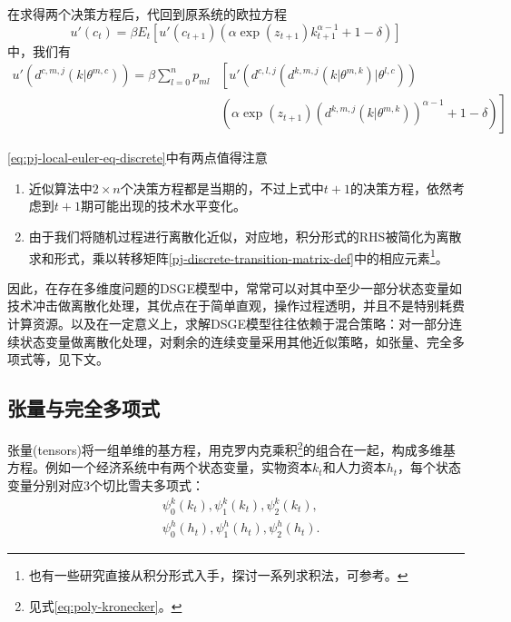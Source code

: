 在求得两个决策方程后，代回到原系统的欧拉方程
\begin{equation}
  \label{eq:pj-local-euler-eq}
  u'(c_t) = \beta E_t \left[ u'\left( c_{t+1} \right) \left( \alpha \exp(z_{t+1}) k_{t+1}^{\alpha - 1} + 1 - \delta \right) \right]
\end{equation}
中，我们有
\begin{equation}
  \label{eq:pj-local-euler-eq-discrete}
  \begin{split}
    u'\left( d^{c,m,j} \left( k | \theta^{m,c} \right)\right) = \beta \sum_{l=0}^{n} p_{ml} &\left[
    u'\left(
    d^{c,l,j}
    \left( d^{k,m,j} \left( k | \theta^{m,k} \right) | \theta^{l,c} \right)
     \right) \right. \\
     & \left. \left(
     \alpha \exp(z_{t+1})
     \left(
     d^{k,m,j} \left( k | \theta^{m,k} \right)
    \right)^{\alpha-1}
     + 1 - \delta
     \right)
    \right]
  \end{split}
\end{equation}

\eqref{eq:pj-local-euler-eq-discrete}中有两点值得注意
\begin{enumerate}
  \item 近似算法中$2 \times n$个决策方程都是当期的，不过上式中$t+1$的决策方程，依然考虑到$t+1$期可能出现的技术水平变化。
  \item  由于我们将随机过程进行离散化近似，对应地，积分形式的RHS被简化为离散求和形式，乘以转移矩阵\eqref{pj-discrete-transition-matrix-def}中的相应元素\footnote{也有一些研究直接从积分形式入手，探讨一系列求积法，可参考\cite{Judd:1998uy,Judd:2011iw}。}。
\end{enumerate}

因此，在存在多维度问题的DSGE模型中，常常可以对其中至少一部分状态变量如技术冲击做离散化处理，其优点在于简单直观，操作过程透明，并且不是特别耗费计算资源。以及在一定意义上，求解DSGE模型往往依赖于混合策略：对一部分连续状态变量做离散化处理，对剩余的连续变量采用其他近似策略，如张量、完全多项式等，见下文。


\subsection{张量与完全多项式}
\label{sec:pj-multidimen-tensor}
张量(tensors)将一组单维的基方程，用克罗内克乘积\footnote{见式\eqref{eq:poly-kronecker}。}的组合在一起，构成多维基方程。例如一个经济系统中有两个状态变量，实物资本$k_t$和人力资本$h_t$，每个状态变量分别对应3个切比雪夫多项式：
\begin{equation*}
  \begin{split}
    &\psi_{0}^k(k_t),\psi_{1}^k(k_t),\psi_{2}^k(k_t),\\
    &\psi_{0}^h(h_t),\psi_{1}^h(h_t),\psi_{2}^h(h_t).
  \end{split}
\end{equation*}

